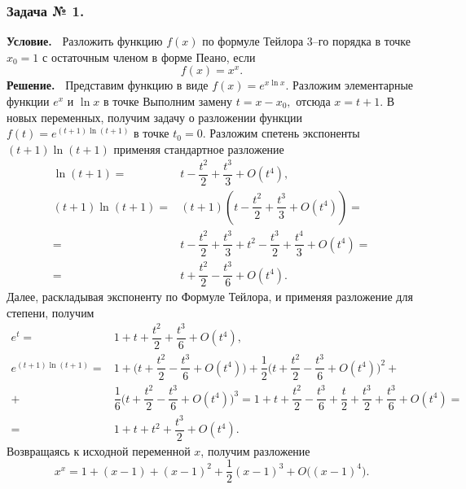 \subsubsection*{\center Задача № 1.}
{\bf Условие.~}
Разложить функцию $f(x)$ по формуле Тейлора 3--го порядка в точке $x_0=1$ с остаточным членом в форме Пеано, если
$$
f(x) = x^x.
$$
{\bf Решение.~}	
Представим функцию в виде $f(x) = e^{x\ln{x}}$. Разложим элементарные функции $e^x$ и $\ln{x}$ в точке 
Выполним замену $t=x-x_0,$ отсюда $x=t+1$. В новых переменных, получим задачу о разложении функции $f(t)=e^{(t+1)\ln{(t+1)}}$ в точке $t_0=0$. Разложим спетень экспоненты $(t+1)\ln{(t+1)}$ применяя стандартное разложение
$$
\begin{array}{rl}
\ln{(t+1)} = &t - \dfrac{t^2}{2} + \dfrac{t^3}{3} + O(t^4), \\[10pt]
(t+1)\ln{(t+1)} = &(t+1)(t - \dfrac{t^2}{2} + \dfrac{t^3}{3} + O(t^4)) =\\[10pt]
=& t - \dfrac{t^2}{2} + \dfrac{t^3}{3} + t^2 - \dfrac{t^3}{2} + \dfrac{t^4}{3} + O(t^4) = \\[10pt]
=& t + \dfrac{t^2}{2} - \dfrac{t^3}{6} + O(t^4).
\end{array}
$$
Далее, раскладывая экспоненту по Формуле Тейлора, и применяя разложение для степени, получим 
$$
\begin{array}{rl}
e^t = & 1 + t + \dfrac{t^2}{2} + \dfrac{t^3}{6} + O(t^4), \\[10pt]
e^{(t+1)\ln{(t+1)}} = & 1 + \bigl(t + \dfrac{t^2}{2} - \dfrac{t^3}{6} + O(t^4)\bigr) 
+ \dfrac{1}{2}\bigl(t + \dfrac{t^2}{2} - \dfrac{t^3}{6} + O(t^4)\bigr)^2 + \\[10pt]
+& \dfrac{1}{6}\bigl(t + \dfrac{t^2}{2} - \dfrac{t^3}{6} + O(t^4)\bigr)^3 =
1 + t + \dfrac{t^2}{2} - \dfrac{t^3}{6} + \dfrac{t}{2}+\dfrac{t^3}{2} + \dfrac{t^3}{6}+O(t^4) = \\[10pt]
=& 1 + t + t^2 + \dfrac{t^3}{2} + O(t^4).
\end{array}
$$
Возвращаясь к исходной переменной $x$, получим разложение
$$
x^x = 1 + (x-1) + (x-1)^2 + \dfrac{1}{2}(x-1)^3 + O\bigl((x-1)^4\bigr).
$$

